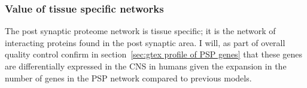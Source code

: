 



\subsubsection{Value of tissue specific networks}
\label{sec:value_of_tissue_specific_networks}

The post synaptic proteome network is tissue specific; it is the network of interacting proteins found in the post synaptic area. I will, as part of overall quality control confirm in section~\ref{sec:gtex profile of PSP genes} that these genes are differentially expressed in the CNS in humans given the expansion in the number of genes in the PSP network compared to previous models\cite{mclean2016improved}.

